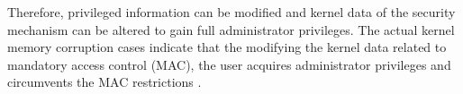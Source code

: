 %
Therefore, privileged information can be modified and kernel data of the security
mechanism can be altered to gain full administrator privileges.
%
The actual kernel memory corruption cases indicate that the modifying the kernel data
related to mandatory access control (MAC), the user acquires administrator
privileges and circumvents the MAC restrictions \cite{nexus5exploit,grsecurity}.


%



